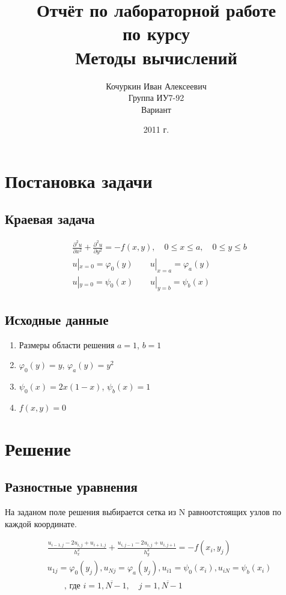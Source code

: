 \documentclass[titlepage,12pt]{article}
\author{Кочуркин Иван Алексеевич \\ Группа ИУ7-92 \\ Вариант \textnumero 11}
\title{Отчёт по лабораторной работе \textnumero 3 \\по курсу\\ Методы вычислений}
\date{2011 г.}
\begin{document}
\maketitle

\setcounter{page}{2}
\newpage
\section{Постановка задачи}
\subsection{Краевая задача}

\begin{align*}
&\frac{\partial^2 u}{\partial x^2} + \frac{\partial^2 u}{\partial y^2} = -f(x,y), \quad 0 \leqslant x \leqslant a, 
	\quad 0 \leqslant y \leqslant b\\
&u|_{x=0} = \varphi_0(y) \qquad u|_{x=a} = \varphi_a(y)\\
&u|_{y=0} = \psi_0(x) \qquad u|_{y=b} = \psi_b(x)
\end{align*}


\subsection{Исходные данные}
\begin{enumerate}
	\item{Размеры области решения $a = 1$, $b = 1$}
	\item{$\varphi_0 (y) = y$, \quad $\varphi_a (y) = y^2$}
	\item{$\psi_0 (x) = 2x(1-x)$, \quad $\psi_b (x) = 1$}
	\item{$f(x,y) = 0$}
\end{enumerate}

\section{Решение}
\subsection{Разностные уравнения}
На заданом поле решения выбирается сетка из N равноотстоящих узлов по каждой координате.\par

\begin{align*}
&\frac{u_{i-1,j} - 2u_{i,j} + u_{i+1,j}}{h_x^2} + \frac{u_{i,j-1} - 2u_{i,j} + u_{i,j+1}}{h_y^2} = -f(x_i,y_j) \\ 
&u_{1j} = \varphi_0(y_j), u_{Nj} = \varphi_a(y_j), u_{i1} = \psi_0(x_i), u_{iN} = \psi_b(x_i)\\
&\qquad \text{, где } i = \overline{1,N-1},\quad	j = \overline{1,N-1}
\end{align*}
\end{document}

